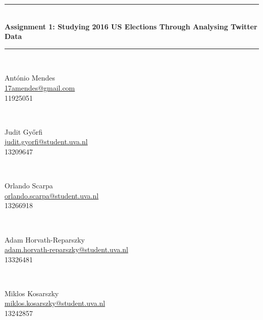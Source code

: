 \documentclass{article}
\newcommand\email[1]{
    \href{mailto:#1}{\url{#1}}
}
\begin{document}
\begin{titlepage}
  \newcommand{\HRule}{\rule{\linewidth{0.5mm}}}

    \begin{center}
      \rule{\linewidth}{0.5mm} \\
      \vspace{0.5 cm}
      \huge{\bfseries Assignment 1: Studying 2016 US Elections Through
        Analysing Twitter Data}
      \rule{\linewidth}{0.5mm}
      \\[1.2 cm]
      \begin{minipage}{0.45\textwidth}
        \begin{flushleft}
        \large
        António Mendes\\
        {\small\email{17amendes@gmail.com}} \\
        {\small 11925051}
        \end{flushleft}
      \end{minipage}
      ~
      \begin{minipage}{0.4\textwidth}
        \begin{flushright}
          \large
          Judit Győrfi\\
          {\small \email{judit.gyorfi@student.uva.nl}}\\
          {\small 13209647}
        \end{flushright}
      \end{minipage}
      \\[1cm]
      \begin{minipage}{0.45\textwidth}
        \begin{flushleft}
        \large
        Orlando Scarpa\\
        {\small \email{orlando.scarpa@student.uva.nl}}\\
        {\small 13266918}
        \end{flushleft}
      \end{minipage}
      ~
      \begin{minipage}{0.4\textwidth}
        \begin{flushright}
          \large
          Adam Horvath-Reparszky\\
          {\small \email{adam.horvath-reparszky@student.uva.nl}}\\
          {\small 13326481}
        \end{flushright}
      \end{minipage}
      \\[1cm]
      \begin{minipage}{0.5\textwidth}
        \begin{center}
          \large
          Miklos Kosarszky\\
          {\small\email{miklos.kosarszky@student.uva.nl}}\\
          {\small 13242857}
        \end{center}
      \end{minipage}
      \vspace{100pt}
    \end{center}


\end{titlepage}
\end{document}
